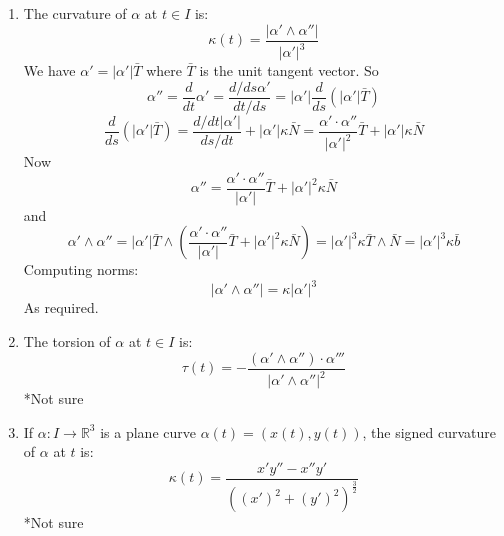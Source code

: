 \documentclass[a4paper,17pt]{extarticle}
\theoremstyle{definition}
\newcommand{\R}{\mathbb{R}}
\begin{document}
\begin{itemize}
\begin{enumerate}[label=\alph*.]
        \item The curvature of $\alpha$ at $t\in I$ is: $$\kappa(t)=\frac{|\alpha'\wedge\alpha''|}{|\alpha'|^3}$$ We have $\alpha'=|\alpha'|\bar{T}$ where $\bar{T}$ is the unit tangent vector. So $$\alpha''=\frac{d}{dt}\alpha'=\frac{d/ds\alpha'}{dt/ds}=|\alpha'|\frac{d}{ds}(|\alpha'|\bar{T})$$ $$\frac{d}{ds}(|\alpha'|\bar{T})=\frac{d/dt|\alpha'|}{ds/dt}+|\alpha'|\kappa\bar{N}=\frac{\alpha'\cdot\alpha''}{|\alpha'|^2}\bar{T}+|\alpha'|\kappa\bar{N}$$ Now $$\alpha''=\frac{\alpha'\cdot\alpha''}{|\alpha'|}\bar{T}+|\alpha'|^2\kappa\bar{N}$$ and $$\alpha'\wedge\alpha''=|\alpha'|\bar{T}\wedge\left(\frac{\alpha'\cdot\alpha''}{|\alpha'|}\bar{T}+|\alpha'|^2\kappa\bar{N}\right)=|\alpha'|^3\kappa\bar{T}\wedge\bar{N}=|\alpha'|^3\kappa\bar{b}$$ Computing norms: $$|\alpha'\wedge\alpha''|=\kappa|\alpha'|^3$$ As required.
        \item The torsion of $\alpha$ at $t\in I$ is: $$\tau(t)=-\frac{(\alpha'\wedge\alpha'')\cdot\alpha'''}{|\alpha'\wedge\alpha''|^2}$$ *Not sure
        \item If $\alpha:I\to\R^3$ is a plane curve $\alpha(t)=(x(t),y(t))$, the signed curvature of $\alpha$ at $t$ is: $$\kappa(t)=\frac{x'y''-x''y'}{((x')^2+(y')^2)^\frac{3}{2}}$$ *Not sure
    \end{enumerate}
\end{itemize}
\end{document}
